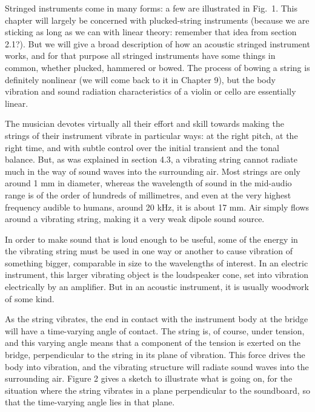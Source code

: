 
  Stringed instruments come in many forms: a few are illustrated in Fig.\ 1. 
  This chapter will largely be concerned with plucked-string instruments 
  (because we are sticking as long as we can with linear theory: remember that 
  idea from section 2.1?). But we will give a broad description of how an 
  acoustic stringed instrument works, and for that purpose all stringed 
  instruments have some things in common, whether plucked, hammered or bowed. 
  The process of bowing a string is definitely nonlinear (we will come back to 
  it in Chapter 9), but the body vibration and sound radiation characteristics 
  of a violin or cello are essentially linear. 

  The musician devotes virtually all their effort and skill towards making the 
  strings of their instrument vibrate in particular ways: at the right pitch, 
  at the right time, and with subtle control over the initial transient and the 
  tonal balance. But, as was explained in section 4.3, a vibrating string 
  cannot radiate much in the way of sound waves into the surrounding air. Most 
  strings are only around 1 mm in diameter, whereas the wavelength of sound in 
  the mid-audio range is of the order of hundreds of millimetres, and even at 
  the very highest frequency audible to humans, around 20 kHz, it is about 17 
  mm. Air simply flows around a vibrating string, making it a very weak dipole 
  sound source. 

  In order to make sound that is loud enough to be useful, some of the energy 
  in the vibrating string must be used in one way or another to cause vibration 
  of something bigger, comparable in size to the wavelengths of interest. In an 
  electric instrument, this larger vibrating object is the loudspeaker cone, 
  set into vibration electrically by an amplifier. But in an acoustic 
  instrument, it is usually woodwork of some kind. 

  As the string vibrates, the end in contact with the instrument body at the 
  bridge will have a time-varying angle of contact. The string is, of course, 
  under tension, and this varying angle means that a component of the tension 
  is exerted on the bridge, perpendicular to the string in its plane of 
  vibration. This force drives the body into vibration, and the vibrating 
  structure will radiate sound waves into the surrounding air. Figure 2 gives a 
  sketch to illustrate what is going on, for the situation where the string 
  vibrates in a plane perpendicular to the soundboard, so that the time-varying 
  angle lies in that plane. 

